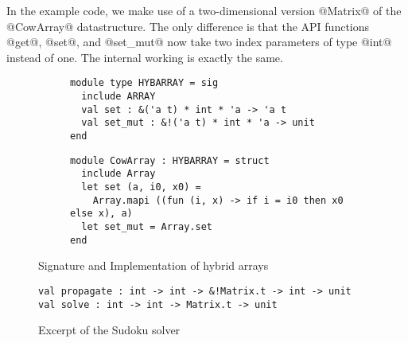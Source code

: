 In the example code, we make use of a two-dimensional version
@Matrix@ of the @CowArray@ data\-structure. The only difference is
that the API functions @get@, @set@, and @set_mut@ now take two index
parameters of type @int@ instead of one. The internal working is exactly the same.


\begin{figure}[tp]
  \centering
  \begin{subfigure}[t]{0.45\linewidth}
\begin{lstlisting}[numbers=none]
module type HYBARRAY = sig
  include ARRAY
  val set : &('a t) * int * 'a -> 'a t
  val set_mut : &!('a t) * int * 'a -> unit
end
\end{lstlisting}
  \end{subfigure}\hfill
  \begin{subfigure}[t]{0.55\linewidth}
\begin{lstlisting}[numbers=none]
module CowArray : HYBARRAY = struct
  include Array
  let set (a, i0, x0) =
    Array.mapi ((fun (i, x) -> if i = i0 then x0 else x), a)
  let set_mut = Array.set
end
\end{lstlisting}
  \end{subfigure}
  \vspace{-15pt}
  \caption{Signature and Implementation of hybrid arrays}
  \label{sig:hybarray}
  \label{ex:cow}

\begin{lstlisting}[numbers=none]
val propagate : int -> int -> &!Matrix.t -> int -> unit
val solve : int -> int -> Matrix.t -> unit
\end{lstlisting}

  \begin{subfigure}[t]{0.45\linewidth}
  
  \end{subfigure}\hfill
  \begin{subfigure}[t]{0.55\linewidth}
  
  \end{subfigure}
  \vspace{-15pt}
  \caption{Excerpt of the Sudoku solver}
  \label{ex:sudoku}
\end{figure}


